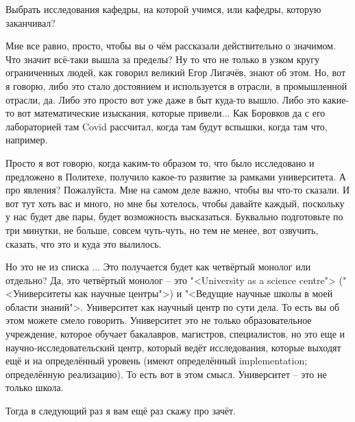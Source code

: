 \documentclass[main.tex]{subfiles}
\begin{document}
Выбрать исследования кафедры, на которой учимся, или кафедры, которую заканчивал?

Мне все равно, просто, чтобы вы о чём рассказали действительно о значимом.
Что значит всё-таки вышла за пределы?
Ну то что не только в узком кругу ограниченных людей, как говорил великий Егор Лигачёв, знают об этом.
Но, вот я говорю, либо это стало достоянием и используется в отрасли, в промышленной отрасли, да.
Либо это просто вот уже даже в быт куда-то вышло.
Либо это какие-то вот математические изыскания, которые привели...
Как Боровков да с его лабораторией там Covid рассчитал, когда там будут вспышки, когда там что, например.

Просто я вот говорю, когда каким-то образом то, что было исследовано и предложено в Политехе, получило какое-то развитие за рамками университета.
А про явления?
Пожалуйста.
Мне на самом деле важно, чтобы вы что-то сказали.
И вот тут хоть вас и много, но мне бы хотелось, чтобы давайте каждый, поскольку у нас будет две пары, будет возможность высказаться.
Буквально подготовьте по три минутки, не больше, совсем чуть-чуть, но тем не менее, вот озвучить, сказать, что это и куда это вылилось.

Но это не из списка ...
Это получается будет как четвёртый монолог или отдельно?
Да, это четвёртый монолог -- это "<University as a science centre"> ("<Университеты как научные центры">) и "<Ведущие научные школы в моей области знаний">.
Университет как научный центр по сути дела.
То есть вы об этом можете смело говорить.
Университет это не только образовательное учреждение, которое обучает бакалавров, магистров, специалистов, но это еще и научно-исследовательский центр, который ведёт исследования, которые выходят ещё и на определённый уровень (имеют определённый implementation; определённую реализацию).
То есть вот в этом смысл.
Университет -- это не только школа.

Тогда в следующий раз я вам ещё раз скажу про зачёт.
\end{document}
